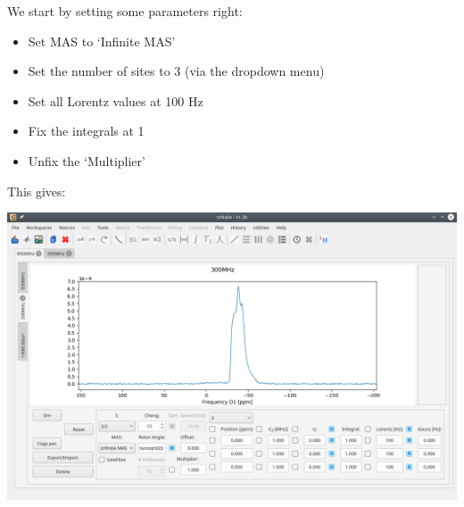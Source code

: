 \documentclass[11pt,a4paper]{article}
\begin{document}
We start by setting some parameters right:
\begin{itemize}
  \item Set MAS to `Infinite MAS'
  \item Set the number of sites to 3 (via the dropdown menu)
  \item Set all Lorentz values at 100 Hz
  \item Fix the integrals at 1
  \item Unfix the `Multiplier'
\end{itemize}
This gives:
\begin{center}
\includegraphics[width=1.0\linewidth]{Figs/Fig8.png}
\end{center}
\end{document}
